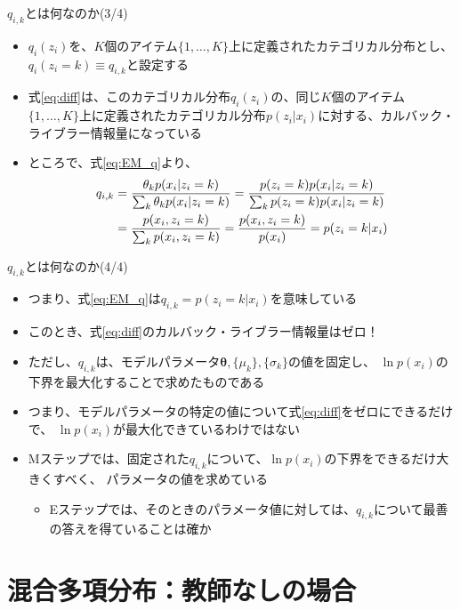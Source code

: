 \documentclass[aspectratio=169,unicode,dvipdfmx,14pt]{beamer}
\begin{document}
\begin{frame}{$q_{i,k}$とは何なのか(3/4)}
\vspace{-.05in}
\begin{itemize}
\item $q_i(z_i)$を、$K$個のアイテム$\{1,\ldots,K\}$上に定義されたカテゴリカル分布とし、
$q_i(z_i=k) \equiv q_{i,k}$と設定する
\item 式\eqref{eq:diff}は、このカテゴリカル分布$q_i(z_i)$の、同じ$K$個のアイテム$\{1,\ldots,K\}$上に定義されたカテゴリカル分布$p(z_i|x_i)$に対する、カルバック・ライブラー情報量になっている
\item ところで、式\eqref{eq:EM_q}より、
\begin{align}
q_{i,k} & = \frac{ \theta_k p(x_i | z_i = k) }{ \sum_k \theta_k p(x_i | z_i = k) }
= \frac{p(z_i=k)p(x_i|z_i=k)}{\sum_k p(z_i=k)p(x_i|z_i=k)}
\notag \\ &
= \frac{p(x_i,z_i=k)}{\sum_k p(x_i,z_i=k)} = \frac{p(x_i,z_i=k)}{p(x_i)} = p(z_i=k|x_i)
\end{align}
\end{itemize}
\end{frame}

\begin{frame}{$q_{i,k}$とは何なのか(4/4)}
\begin{itemize}
\item つまり、式\eqref{eq:EM_q}は$q_{i,k} = p(z_i=k|x_i)$を意味している
\item このとき、式\eqref{eq:diff}のカルバック・ライブラー情報量はゼロ！
\item ただし、$q_{i,k}$は、モデルパラメータ$\bm{\theta},\{\mu_k\},\{\sigma_k\}$の値を固定し、
$\ln p(x_i)$の下界を最大化することで求めたものである
\item つまり、モデルパラメータの特定の値について式\eqref{eq:diff}をゼロにできるだけで、
$\ln p(x_i)$が最大化できているわけではない
\item Mステップでは、固定された$q_{i,k}$について、$\ln p(x_i)$の下界をできるだけ大きくすべく、
パラメータの値を求めている
\begin{itemize}
\item Eステップでは、そのときのパラメータ値に対しては、$q_{i,k}$について最善の答えを得ていることは確か
\end{itemize}
\end{itemize}
\end{frame}



\section{混合多項分布：教師なしの場合}
\end{document}

